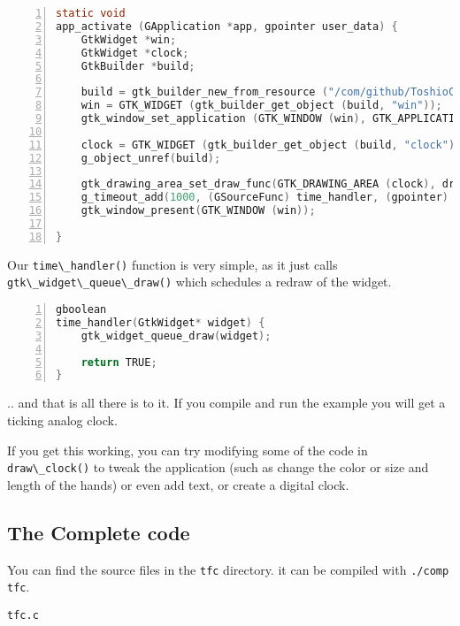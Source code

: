 \begin{lstlisting}[language=C, numbers=left]
static void
app_activate (GApplication *app, gpointer user_data) {
    GtkWidget *win;
    GtkWidget *clock;
    GtkBuilder *build;

    build = gtk_builder_new_from_resource ("/com/github/ToshioCP/tfc/tfc.ui");
    win = GTK_WIDGET (gtk_builder_get_object (build, "win"));
    gtk_window_set_application (GTK_WINDOW (win), GTK_APPLICATION (app));

    clock = GTK_WIDGET (gtk_builder_get_object (build, "clock"));
    g_object_unref(build);

    gtk_drawing_area_set_draw_func(GTK_DRAWING_AREA (clock), draw_clock, NULL, NULL);
    g_timeout_add(1000, (GSourceFunc) time_handler, (gpointer) clock);
    gtk_window_present(GTK_WINDOW (win));

}
\end{lstlisting}

Our \passthrough{\lstinline!time\_handler()!} function is very simple,
as it just calls \passthrough{\lstinline!gtk\_widget\_queue\_draw()!}
which schedules a redraw of the widget.

\begin{lstlisting}[language=C, numbers=left]
gboolean
time_handler(GtkWidget* widget) {
    gtk_widget_queue_draw(widget);

    return TRUE;
}
\end{lstlisting}

.. and that is all there is to it. If you compile and run the example
you will get a ticking analog clock.

If you get this working, you can try modifying some of the code in
\passthrough{\lstinline!draw\_clock()!} to tweak the application (such
as change the color or size and length of the hands) or even add text,
or create a digital clock.

\subsection{The Complete code}\label{the-complete-code}

You can find the source files in the \passthrough{\lstinline!tfc!}
directory. it can be compiled with \passthrough{\lstinline!./comp tfc!}.

\passthrough{\lstinline!tfc.c!}

